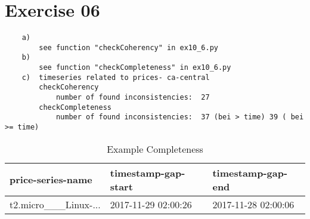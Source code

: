 \documentclass[11pt,a4paper]{scrartcl}
\begin{document}
\section*{Exercise 06}
\begin{verbatim}
	a) 
		see function "checkCoherency" in ex10_6.py
	b) 
		see function "checkCompleteness" in ex10_6.py
	c)	timeseries related to prices- ca-central
		checkCoherency
			number of found inconsistencies:  27
		checkCompleteness
			number of found inconsistencies:  37 (bei > time) 39 ( bei >= time)
\end{verbatim}

\begin{table}[]
\centering
\caption{Example Completeness}
\label{my-label}
\begin{tabular}{lll}
\hline
\multicolumn{1}{|l|}{price-series-name} & \multicolumn{1}{l|}{timestamp-gap-start} & \multicolumn{1}{l|}{timestamp-gap-end} \\ \hline
t2.micro\_\_\_Linux-...                 & 2017-11-29 02:00:26                      & 2017-11-28 02:00:06                   
\end{tabular}
\end{table}
\end{document}

